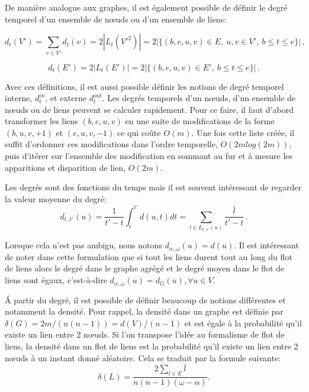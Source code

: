 De manière analogue aux graphes, il est également possible de définir le degré temporel d'un ensemble de n\oe uds ou d'un ensemble de liens:

\begin{equation}
d_t(V')= \sum_{v \in V'} d_t(v) = 2 |L_{t}(V'^2)| = 2|\{(b,e,u,v) \in E,\ u,v \in V',\ b \leq t \leq e\}|\,,
\end{equation}

\begin{equation}
d_t(E')=2|L_{t}(E')|= 2|\{(b,e,u,v) \in E',\ b \leq t \leq e\}|\,.
\end{equation}

Avec ces définitions, il est aussi possible définir les notions de degré temporel interne, $d_t^{in}$, et externe $d_t^{out}$.
Les degrés temporels d'un n\oe uds, d'un ensemble de n\oe uds ou de liens peuvent se calculer rapidement.
Pour ce faire, il faut d'abord transformer les liens $(b,e,u,v)$ en une suite de modifications de la forme $(b,u,v,+1)$ et $(e,u,v,-1)$ ce qui coûte $O(m)$.
Une fois cette liste créée, il suffit d'ordonner ces modifications dans l'ordre temporelle, $O(2mlog(2m))$, puis d'itérer sur l'ensemble des modification en sommant au fur et à mesure les apparitions et disparition de lien, $O(2m)$.
\bigskip

Les degrés sont des fonctions du temps mais il est souvent intéressant de regarder la valeur moyenne du degré:
\begin{equation}
d_{t..t'}(u)=\dfrac{1}{t'-t}  \int_{t}^{t'}d(u,t) dt = \sum_{l \in L_{t..t'}(u)} \dfrac{\bar{l}}{t'-t} \, .
\label{eq:deg_moyen}
\end{equation}

Lorsque cela n'est pas ambigu, nous notons $d_{\alpha..\omega}(u) = d(u)$.
Il est intéressant de noter dans cette formulation que si tout les liens durent tout au long du flot de liens alors le degré dans le graphe agrégé et le degré moyen dans le flot de liens sont égaux, c'est-à-dire  $d_{\alpha..\omega}(u) = d_G(u), \forall u \in V$.

\'A partir du degré, il est possible de définir beaucoup de notions différentes et notamment la densité.
Pour rappel, la densité dans un graphe est définie par $\delta(G)=2m/(n(n-1))=d(V)/(n-1)$ et est égale à la probabilité qu'il existe un lien entre 2 n\oe uds.
Si l'on transpose l'idée au formalisme de flot de liens, la densité dans un flot de liens est la probabilité qu'il existe un lien entre 2 n\oe uds à un instant donné aléatoire.
Cela se traduit par la formule suivante:
\begin{equation}
\delta(L)= \dfrac{2 \sum_{l \in E}\bar{l}}{n(n-1) (\omega-\alpha)}.
\end{equation}

